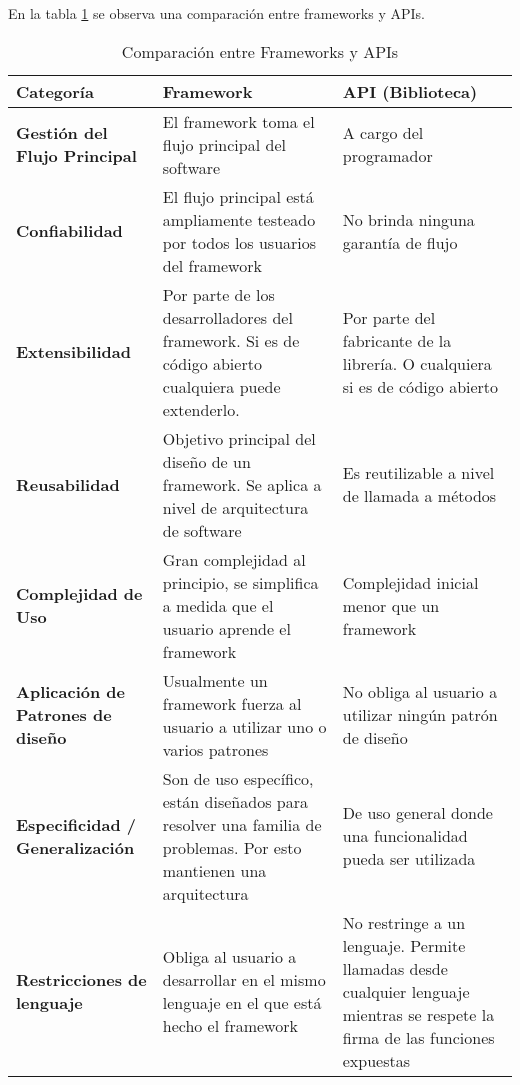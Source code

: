 En la tabla \ref {tab:comparacion_frameworks_apis} se observa una comparación
entre frameworks y APIs.
\begin{table}
	\centering
	\begin{tabularx}{\textwidth}{ | p{2.5cm} | X | X | }
	\hline
	\textbf{Categoría} & \textbf{Framework} & \textbf{API (Biblioteca)} \\[10pt]
	\hline
    \textbf{Gestión del Flujo Principal} & El framework toma el
    flujo principal del software & A cargo del programador\\[10pt] \hline
    \textbf{Confiabilidad} & El flujo principal está ampliamente testeado por todos
    los usuarios del framework & No brinda ninguna garantía de flujo\\[10pt] \hline
    \textbf{Extensibilidad} & Por parte de los desarrolladores del
	framework.
	Si es de código abierto cualquiera puede extenderlo. & Por parte del fabricante de la
	librería.
	O cualquiera si es de código abierto \\[10pt] \hline
	\textbf{Reusabilidad} & Objetivo principal del diseño de un framework.
	Se aplica a nivel de arquitectura de software & Es reutilizable a nivel
	de llamada a métodos\\[10pt] \hline 
	\textbf{Complejidad de Uso} & Gran
	complejidad al principio, se simplifica a medida que el usuario aprende el framework & Complejidad inicial menor que un
	framework\\[10pt] \hline 
	\textbf{Aplicación de Patrones de diseño} & Usualmente un framework fuerza al
	usuario a utilizar uno o varios patrones & No obliga al usuario a utilizar ningún patrón
	de diseño\\[10pt] \hline 
	\textbf{Especificidad / Generalización} & Son de uso específico,
	están diseñados para resolver una familia de problemas. Por esto mantienen una
	arquitectura & De uso general donde una funcionalidad pueda ser
	utilizada\\[10pt] \hline 
	\textbf{Restricciones de lenguaje} & Obliga al usuario a
	desarrollar en el mismo lenguaje en el que está hecho el framework & No restringe a un lenguaje.
	Permite llamadas desde cualquier lenguaje mientras se respete la firma de las funciones expuestas\\[10pt] 
	\hline
	\end{tabularx}
	\caption{Comparación entre Frameworks y APIs}
	\label{tab:comparacion_frameworks_apis}
\end{table}

